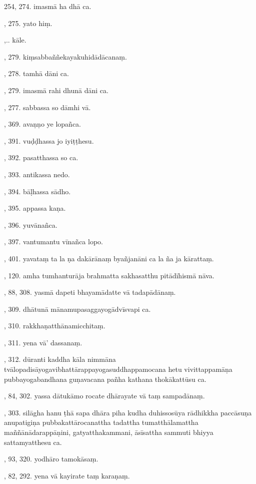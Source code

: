 254, 274. imasmā ha dhā ca.\par {}, 275. yato hiṃ.\par {},.. kāle.\par {}, 279. kiṃsabbaññekayakuhidādācanaṃ.\par {}, 278. tamhā dāni ca.\par {}, 279. imasmā rahi dhunā dāni ca.\par {}, 277. sabbassa so dāmhi vā.\par {}, 369. avaṇṇo ye lopañca.\par {}, 391. vuḍḍhassa jo iyiṭṭhesu.\par {}, 392. pasatthassa so ca.\par {}, 393. antikassa nedo.\par {}, 394. bāḷhassa sādho.\par {}, 395. appassa kaṇa.\par {}, 396. yuvānañca.\par {}, 397. vantumantu vīnañca lopo.\par {}, 401. yavataṃ ta la ṇa dakārānaṃ byañjanāni ca la ña ja kārattaṃ.\par {}, 120. amha tumhanturāja brahmatta sakhasatthu pitādīhismā nāva.\par {}, 88, 308. yasmā dapeti bhayamādatte vā tadapādānaṃ.\par {}, 309. dhātunā mānamupasaggayogādvīsvapi ca.\par {}, 310. rakkhaṇatthānamicchitaṃ.\par {}, 311. yena vā’ dassanaṃ.\par {}, 312. dūranti kaddha kāla nimmāna tvālopadisāyogavibhattārappayogasuddhappamocana hetu vivittappamāṇa pubbayogabandhana guṇavacana pañha kathana thokākattūsu ca.\par {}, 84, 302. yassa dātukāmo rocate dhārayate vā taṃ sampadānaṃ.\par {}, 303. silāgha hanu ṭhā sapa dhāra piha kudha duhissosūya rādhikkha paccāsuṇa anupatigiṇa pubbakattārocanattha tadattha tumatthālamattha maññānādarappāṇini, gatyatthakammani, āsīsattha sammuti bhiyya sattamyatthesu ca.\par {}, 93, 320. yodhāro tamokāsaṃ.\par {}, 82, 292. yena vā kayirate taṃ karaṇaṃ.\par \noindent
